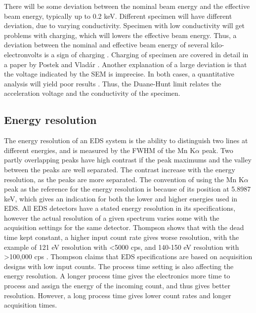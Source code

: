 There will be some deviation between the nominal beam energy and the effective beam energy, typically up to 0.2 keV.
Different specimen will have different deviation, due to varying conductivity.
Specimen with low conductivity will get problems with charging, which will lowers the effective beam energy.
Thus, a deviation between the nominal and effective beam energy of several kilo-electronvolts is a sign of charging \cite{dtsaii_2_manipulating_spectra}.
Charging of specimen are covered in detail in a paper by Postek and Vladár \cite{postek_charging_2015}.
Another explanation of a large deviation is that the voltage indicated by the SEM is imprecise.
In both cases, a quantitative analysis will yield poor results \cite{iso_quantification_22309}.
Thus, the Duane-Hunt limit relates the acceleration voltage and the conductivity of the specimen.








\subsection{Energy resolution}
\label{theory:eds_performance:energyres}


The energy resolution of an EDS system is the ability to distinguish two lines at different energies, and is measured by the FWHM of the Mn K$\alpha$ peak.
Two partly overlapping peaks have high contrast if the peak maximums and the valley between the peaks are well separated.
The contrast increase with the energy resolution, as the peaks are more separated.
The convention of using the Mn K$\alpha$ peak as the reference for the energy resolution is because of its position at 5.8987 keV, which gives an indication for both the lower and higher energies used in EDS.
All EDS detectors have a stated energy resolution in its specifications, however the actual resolution of a given spectrum varies some with the acquisition settings for the same detector.
Thompson shows that with the dead time kept constant, a higher input count rate gives worse resolution, with the example of 121 eV resolution with <5000 cps, and 140-150 eV resolution with >100,000 cps \cite{keith_energy_res_2013}.
Thompson claims that EDS specifications are based on acquisition designs with low input counts.
The process time setting is also affecting the energy resolution.
A longer process time gives the electronics more time to process and assign the energy of the incoming count, and thus gives better resolution.
However, a long process time gives lower count rates and longer acquisition times.


